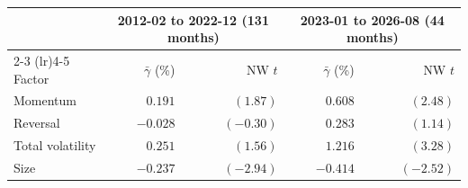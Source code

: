 \begin{tabular}{lrrrr}
\toprule
& \multicolumn{2}{c}{2012-02 to 2022-12 (131 months)} & \multicolumn{2}{c}{2023-01 to 2026-08 (44 months)} \\
\cmidrule(lr){2-3} \cmidrule(lr){4-5}
Factor & $\bar\gamma$ (\%) & NW $t$ & $\bar\gamma$ (\%) & NW $t$ \\
\midrule
Momentum & $0.191$ & $(1.87)$ & $0.608$ & $(2.48)$ \\
Reversal & $-0.028$ & $(-0.30)$ & $0.283$ & $(1.14)$ \\
Total volatility & $0.251$ & $(1.56)$ & $1.216$ & $(3.28)$ \\
Size & $-0.237$ & $(-2.94)$ & $-0.414$ & $(-2.52)$ \\
\bottomrule
\end{tabular}

